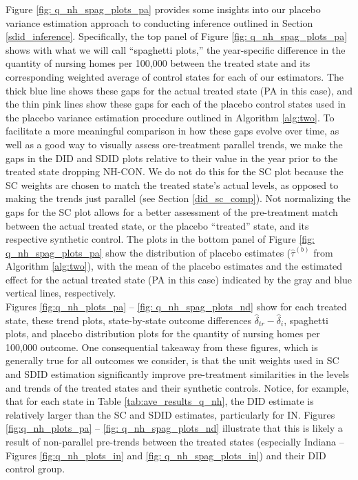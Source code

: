 \documentclass[../Main.tex]{subfiles}
\begin{document}
\indent Figure \ref{fig: q_nh_spag_plots_pa} provides some insights into our placebo variance estimation approach to conducting inference outlined in Section \ref{sdid_inference}. Specifically, the top panel of Figure \ref{fig: q_nh_spag_plots_pa} shows with what we will call ``spaghetti plots,'' the year-specific difference in the quantity of nursing homes per 100,000 between the treated state and its corresponding weighted average of control states for each of our estimators. The thick blue line shows these gaps for the actual treated state (PA in this case), and the thin pink lines show these gaps for each of the placebo control states used in the placebo variance estimation procedure outlined in Algorithm \ref{alg:two}. To facilitate a more meaningful comparison in how these gaps evolve over time, as well as a good way to visually assess ore-treatment parallel trends, we make the gaps in the DID and SDID plots relative to their value in the year prior to the treated state dropping NH-CON. We do not do this for the SC plot because the SC weights are chosen to match the treated state's actual levels, as opposed to making the trends just parallel (see Section \ref{did_sc_comp}). Not normalizing the gaps for the SC plot allows for a better assessment of the pre-treatment match between the actual treated state, or the placebo ``treated'' state, and its respective synthetic control. The plots in the bottom panel of Figure \ref{fig: q_nh_spag_plots_pa} show the distribution of placebo estimates ($\hat{\tau}^{(b)}$ from Algorithm \ref{alg:two}), with the mean of the placebo estimates and the estimated effect for the actual treated state (PA in this case) indicated by the gray and blue vertical lines, respectively.\\  
\indent Figures \ref{fig:q_nh_plots_pa} -- \ref{fig: q_nh_spag_plots_nd} show for each treated state, these trend plots, state-by-state outcome differences $\hat{\delta}_{tr}-\hat{\delta}_i$, spaghetti plots, and placebo distribution plots for the quantity of nursing homes per 100,000 outcome. One consequential takeaway from these figures, which is generally true for all outcomes we consider, is that the unit weights used in SC and SDID estimation significantly improve pre-treatment similarities in the levels and trends of the treated states and their synthetic controls. Notice, for example, that for each state in Table \ref{tab:ave_results_q_nh}, the DID estimate is relatively larger than the SC and SDID estimates, particularly for IN. Figures \ref{fig:q_nh_plots_pa} -- \ref{fig: q_nh_spag_plots_nd} illustrate that this is likely a result of non-parallel pre-trends between the treated states (especially Indiana -- Figures \ref{fig:q_nh_plots_in} and \ref{fig: q_nh_spag_plots_in}) and their DID control group.\\
\end{document}

